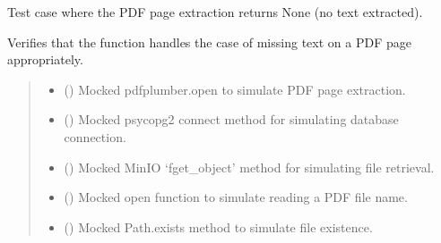 \documentclass[letterpaper,10pt,english]{sphinxmanual}
\begin{document}

\begin{fulllineitems}
\label{\detokenize{test.data_storage:test.data_storage.test_retry_failed_reports.test_pdf_page_no_text}}
\pysigstartsignatures
\pysiglinewithargsret
{}
{\sphinxparamcomma {}\sphinxparamcomma {}\sphinxparamcomma {}\sphinxparamcomma {}}
{}
\pysigstopsignatures
\sphinxAtStartPar
Test case where the PDF page extraction returns None (no text extracted).

\sphinxAtStartPar
Verifies that the function handles the case of missing text on a PDF page appropriately.
\begin{quote}\begin{description}
\begin{itemize}
\item {} 
\sphinxAtStartPar
{} () \textendash{} Mocked pdfplumber.open to simulate PDF page extraction.

\item {} 
\sphinxAtStartPar
{} () \textendash{} Mocked psycopg2 connect method for simulating database connection.

\item {} 
\sphinxAtStartPar
{} () \textendash{} Mocked MinIO ‘fget\_object’ method for simulating file retrieval.

\item {} 
\sphinxAtStartPar
{} () \textendash{} Mocked open function to simulate reading a PDF file name.

\item {} 
\sphinxAtStartPar
{} () \textendash{} Mocked Path.exists method to simulate file existence.

\end{itemize}

\end{description}\end{quote}

\end{fulllineitems}
\end{document}
